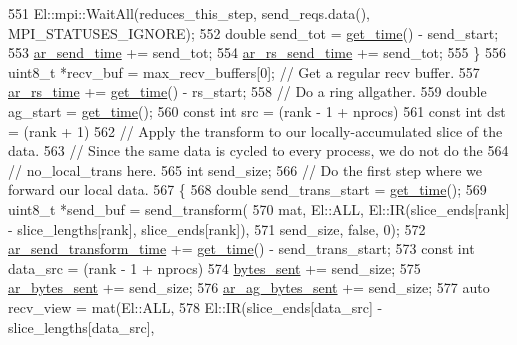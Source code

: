 \begin{DoxyCode}
551     El::mpi::WaitAll(reduces\_this\_step, send\_reqs.data(), MPI\_STATUSES\_IGNORE);
552     \textcolor{keywordtype}{double} send\_tot = \hyperlink{namespacelbann_a478d36031ff0659893c4322cd856157f}{get\_time}() - send\_start;
553     \hyperlink{classlbann_1_1lbann__comm_a60a664f47efb52d9936b72d34059d1ef}{ar\_send\_time} += send\_tot;
554     \hyperlink{classlbann_1_1lbann__comm_aaadab22d368e8004a9877828a3bc9e93}{ar\_rs\_send\_time} += send\_tot;
555   \}
556   uint8\_t *recv\_buf = max\_recv\_buffers[0];  \textcolor{comment}{// Get a regular recv buffer.}
557   \hyperlink{classlbann_1_1lbann__comm_a85022d803e339eb14a15129a07876c2b}{ar\_rs\_time} += \hyperlink{namespacelbann_a478d36031ff0659893c4322cd856157f}{get\_time}() - rs\_start;
558   \textcolor{comment}{// Do a ring allgather.}
559   \textcolor{keywordtype}{double} ag\_start = \hyperlink{namespacelbann_a478d36031ff0659893c4322cd856157f}{get\_time}();
560   \textcolor{keyword}{const} \textcolor{keywordtype}{int} src = (rank - 1 + nprocs) %
561   \textcolor{keyword}{const} \textcolor{keywordtype}{int} dst = (rank + 1) %
562   \textcolor{comment}{// Apply the transform to our locally-accumulated slice of the data.}
563   \textcolor{comment}{// Since the same data is cycled to every process, we do not do the}
564   \textcolor{comment}{// no\_local\_trans here.}
565   \textcolor{keywordtype}{int} send\_size;
566   \textcolor{comment}{// Do the first step where we forward our local data.}
567   \{
568     \textcolor{keywordtype}{double} send\_trans\_start = \hyperlink{namespacelbann_a478d36031ff0659893c4322cd856157f}{get\_time}();
569     uint8\_t *send\_buf = send\_transform(
570                           mat, El::ALL, El::IR(slice\_ends[rank] - slice\_lengths[rank], slice\_ends[rank]),
571                           send\_size, \textcolor{keyword}{false}, 0);
572     \hyperlink{classlbann_1_1lbann__comm_a4e3d35520a8f567579f9235e9808ba1c}{ar\_send\_transform\_time} += \hyperlink{namespacelbann_a478d36031ff0659893c4322cd856157f}{get\_time}() - send\_trans\_start;
573     \textcolor{keyword}{const} \textcolor{keywordtype}{int} data\_src = (rank - 1 + nprocs) %
574     \hyperlink{classlbann_1_1lbann__comm_ad1f146ae7337ece6266fd307944928e0}{bytes\_sent} += send\_size;
575     \hyperlink{classlbann_1_1lbann__comm_aa520c16eafde742b70daf60866afc6a8}{ar\_bytes\_sent} += send\_size;
576     \hyperlink{classlbann_1_1lbann__comm_a2cfe1264a83865360692c48d7869fe67}{ar\_ag\_bytes\_sent} += send\_size;
577     \textcolor{keyword}{auto} recv\_view = mat(El::ALL,
578                          El::IR(slice\_ends[data\_src] - slice\_lengths[data\_src],

\end{DoxyCode}
